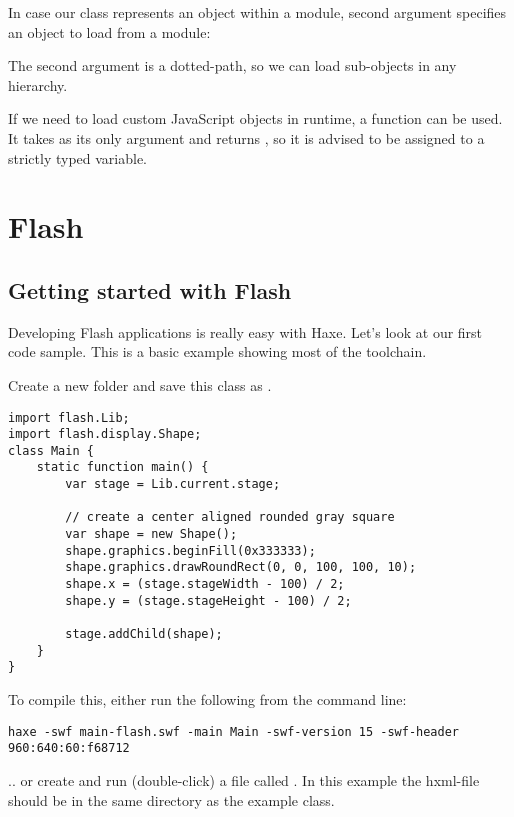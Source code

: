 
In case our  class represents an object within a module, second  argument specifies an object to load from a module:


The second argument is a dotted-path, so we can load sub-objects in any hierarchy.

If we need to load custom JavaScript objects in runtime, a  function can be used. It takes  as its only argument and returns , so it is advised to be assigned to a strictly typed variable.

\section{Flash}
\label{target-flash}

\subsection{Getting started with Flash}
\label{target-flash-getting-started}

Developing Flash applications is really easy with Haxe. Let's look at our first code sample.
This is a basic example showing most of the toolchain. 

Create a new folder and save this class as .

\begin{lstlisting}
import flash.Lib;
import flash.display.Shape;
class Main {
    static function main() {
        var stage = Lib.current.stage;
        
        // create a center aligned rounded gray square
        var shape = new Shape();
        shape.graphics.beginFill(0x333333);
		shape.graphics.drawRoundRect(0, 0, 100, 100, 10);
		shape.x = (stage.stageWidth - 100) / 2;
		shape.y = (stage.stageHeight - 100) / 2;
		
		stage.addChild(shape);
    }    
}
\end{lstlisting}

To compile this, either run the following from the command line:

\begin{lstlisting}
haxe -swf main-flash.swf -main Main -swf-version 15 -swf-header 960:640:60:f68712
\end{lstlisting}

.. or create and run (double-click) a file called . In this example the hxml-file should be in the same directory as the example class.

